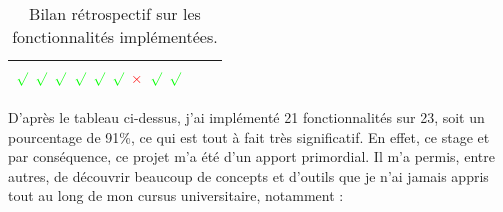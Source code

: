 \begin{table}[h]
\begin{tabular}{|m{4cm}|m{10cm}|m{2cm}|}
		\begin{math} \color{green} \surd \end{math} \newline
		\begin{math} \color{green} \surd \end{math} \newline
		\begin{math} \color{green} \surd \end{math} \newline
		\begin{math} \color{green} \surd \end{math} \newline
		\begin{math} \color{green} \surd \end{math} \newline
		\begin{math} \color{green} \surd \end{math} \newline
		\begin{math} \color{red} \times \end{math} \newline
		\begin{math} \color{green} \surd \end{math} \newline
		\begin{math} \color{green} \surd \end{math} \\
		\hline
	\end{tabular}
	\caption{Bilan rétrospectif sur les fonctionnalités implémentées.}
	\label{6.1}
\end{table}
D'après le tableau ci-dessus, j'ai implémenté 21 fonctionnalités sur 23, soit un pourcentage de 91\%, ce qui est tout à fait très significatif. \newline
En effet, ce stage et par conséquence, ce projet m'a été d’un apport primordial. Il m'a permis, entre autres, de découvrir beaucoup de concepts et d’outils que je n’ai jamais appris tout au long de mon cursus universitaire, notamment :
